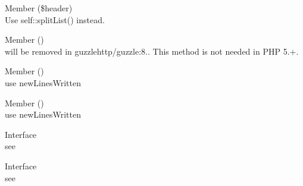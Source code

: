 \begin{DoxyRefList}
\item[Member \doxylink{class_guzzle_http_1_1_psr7_1_1_header_abc5c82d9bdc1a107230f41256c8c1769}{Guzzle\+Http\textbackslash{}Psr7\textbackslash{}Header\+::normalize} (\$header)]\hfill \\
\label{deprecated__deprecated000046}%
%
Use self\+::split\+List() instead.  
\item[Member \doxylink{class_guzzle_http_1_1_utils_ab819a0e5ef529aba56e939e376d20cc9}{Guzzle\+Http\textbackslash{}Utils\+::default\+Ca\+Bundle} ()]\hfill \\
\label{deprecated__deprecated000045}%
%
 will be removed in guzzlehttp/guzzle\+:8.. This method is not needed in PHP 5.+.  
\item[Member \doxylink{interface_illuminate_1_1_console_1_1_contracts_1_1_new_line_aware_ad682840f917fb79f0023abf95a86509f}{Illuminate\textbackslash{}Console\textbackslash{}Contracts\textbackslash{}New\+Line\+Aware\+::new\+Line\+Written} ()]\hfill \\
\label{deprecated__deprecated000047}%
%
use new\+Lines\+Written  
\item[Member \doxylink{class_illuminate_1_1_console_1_1_output_style_a970683d379cbdcdf5d99dae3f47b08b0}{Illuminate\textbackslash{}Console\textbackslash{}Output\+Style\+::new\+Line\+Written} ()]\hfill \\
\label{deprecated__deprecated000049}%
%
use new\+Lines\+Written  
\item[Interface \doxylink{interface_illuminate_1_1_contracts_1_1_validation_1_1_implicit_rule}{Illuminate\textbackslash{}Contracts\textbackslash{}Validation\textbackslash{}Implicit\+Rule} ]\hfill \\
\label{deprecated__deprecated000050}%
%
see   
\item[Interface \doxylink{interface_illuminate_1_1_contracts_1_1_validation_1_1_invokable_rule}{Illuminate\textbackslash{}Contracts\textbackslash{}Validation\textbackslash{}Invokable\+Rule} ]\hfill \\
\label{deprecated__deprecated000051}%
%
see   

\end{DoxyRefList}

